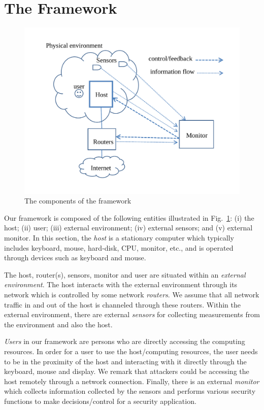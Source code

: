 \section{The Framework}
\label{sec:framework}

\begin{figure}
\centering
\includegraphics[width=0.95\columnwidth]{sensor/components}
\caption{The components of the framework} \label{fig:components}
\end{figure}

Our framework is composed of the following
entities illustrated in Fig.~\ref{fig:components}:
(i) the host;
(ii) user;
(iii) external environment;
(iv) external sensors;
and (v) external monitor.
In this section, the {\em host} is a stationary computer which typically includes
keyboard, mouse, hard-disk, CPU, monitor, etc., and is operated through 
devices such as keyboard and mouse.

The host, router(s), sensors, monitor and user are situated within
an {\em external environment}.
The host interacts with the external environment through its network
which is controlled by some network {\em routers}.
We assume that all network traffic in and out of the host is
channeled through these routers.
Within the external environment, there are external {\em sensors} for
collecting measurements from the environment and also the host.

{\em Users} in our framework are persons who are
directly accessing the computing resources.
In order for a user to use the host/computing resources, the user
needs to be in the proximity of the host and interacting with it directly
through the keyboard, mouse and display.
We remark that attackers could be accessing the host remotely through
a network connection.
Finally, there is an external {\em monitor} which collects information
collected by the sensors and performs various security functions to
make decisions/control for a security application.

